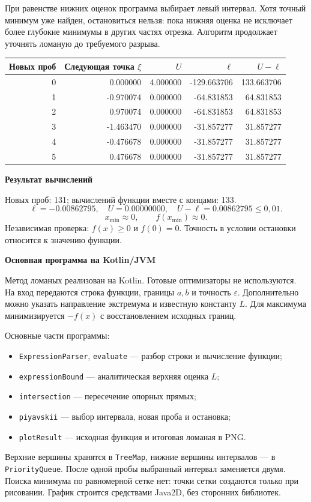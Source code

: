 \documentclass[12pt,a4paper]{article}
\begin{document}
При равенстве нижних оценок программа выбирает левый интервал.
Хотя точный минимум уже найден, остановиться нельзя: пока нижняя оценка
не исключает более глубокие минимумы в других частях отрезка.
Алгоритм продолжает уточнять ломаную до требуемого разрыва.
\begin{center}\small
\begin{tabular}{r|r|r|r|r}
Новых проб & Следующая точка $\xi$ & $U$ & $\ell$ & $U-\ell$\\\hline
0 & 0.000000 & 4.000000 & -129.663706 & 133.663706\\
1 & -0.970074 & 0.000000 & -64.831853 & 64.831853\\
2 & 0.970074 & 0.000000 & -64.831853 & 64.831853\\
3 & -1.463470 & 0.000000 & -31.857277 & 31.857277\\
4 & -0.476678 & 0.000000 & -31.857277 & 31.857277\\
5 & 0.476678 & 0.000000 & -31.857277 & 31.857277\\
\end{tabular}\end{center}
\par\textbf{Результат вычислений}\par
Новых проб: 131; вычислений функции вместе с концами: 133.
\[\ell=-0.00862795,\quad U=0.00000000,\quad U-\ell=0.00862795\le0{,}01.\]
\[
\boxed{x_{\min}\approx0,\qquad f(x_{\min})\approx0.}
\]
Независимая проверка: $f(x)\ge0$ и $f(0)=0$.
Точность в условии остановки относится к значению функции.
\newpage
\par\textbf{Основная программа на Kotlin/JVM}\par
Метод ломаных реализован на Kotlin. Готовые оптимизаторы не используются.
На вход передаются строка функции, границы $a,b$ и точность $\varepsilon$.
Дополнительно можно указать направление экстремума и известную константу $L$.
Для максимума минимизируется $-f(x)$ с восстановлением исходных границ.

Основные части программы:
\begin{itemize}
\item \texttt{ExpressionParser}, \texttt{evaluate} --- разбор строки и вычисление функции;
\item \texttt{expressionBound} --- аналитическая верхняя оценка $L$;
\item \texttt{intersection} --- пересечение опорных прямых;
\item \texttt{piyavskii} --- выбор интервала, новая проба и остановка;
\item \texttt{plotResult} --- исходная функция и итоговая ломаная в PNG.
\end{itemize}
Верхние вершины хранятся в \texttt{TreeMap}, нижние вершины интервалов ---
в \texttt{PriorityQueue}. После одной пробы выбранный интервал заменяется
двумя. Поиска минимума по равномерной сетке нет: точки сетки создаются только
при рисовании. График строится средствами Java2D, без сторонних библиотек.
\end{document}
